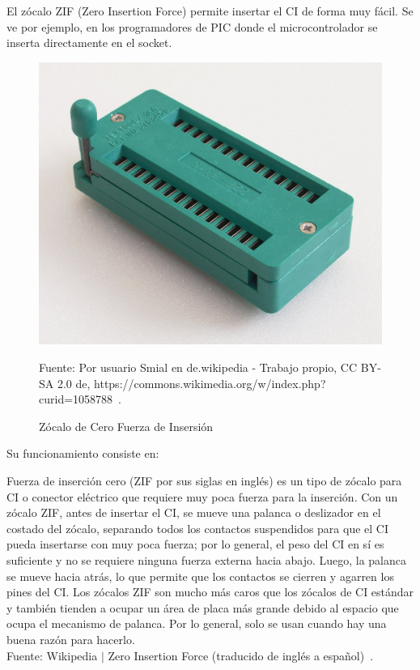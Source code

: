 \documentclass[conference]{IEEEtran}
\begin{document}
    El zócalo ZIF (Zero Insertion Force) permite insertar el CI de forma muy
    fácil. Se ve por ejemplo, en los programadores de PIC donde el
    microcontrolador se inserta directamente en el socket.

    \begin{figure}[H]
        \centering
        \includegraphics[width=0.2\paperwidth]{images/zif-socket}
        \caption{Zócalo de Cero Fuerza de Insersión} \footnotesize
        Fuente: Por usuario Smial en de.wikipedia - Trabajo propio, CC BY-SA
        2.0 de, https://commons.wikimedia.org/w/index.php?curid=1058788~\cite{wikipedia-zif-2021}.\label{fig:figure3}
    \end{figure}

    \bigbreak

    Su funcionamiento consiste en:

    \bigbreak

    \begin{displayquote}
        Fuerza de inserción cero (ZIF por sus siglas en inglés) es un tipo de
        zócalo para CI o conector eléctrico que requiere muy poca fuerza para
        la inserción. Con un zócalo ZIF, antes de insertar el CI, se mueve
        una palanca o deslizador en el costado del zócalo, separando todos
        los contactos suspendidos para que el CI pueda insertarse con muy
        poca fuerza; por lo general, el peso del CI en sí es suficiente y no
        se requiere ninguna fuerza externa hacia abajo. Luego, la palanca se
        mueve hacia atrás, lo que permite que los contactos se cierren y
        agarren los pines del CI. Los zócalos ZIF son mucho más caros que los
        zócalos de CI estándar y también tienden a ocupar un área de placa
        más grande debido al espacio que ocupa el mecanismo de palanca. Por
        lo general, solo se usan cuando hay una buena razón para hacerlo.\\
        \small
        Fuente: Wikipedia $\mid$ Zero Insertion Force (traducido de inglés a
        español)~\cite{wikipedia-zif-2021}.
    \end{displayquote}
\end{document}
